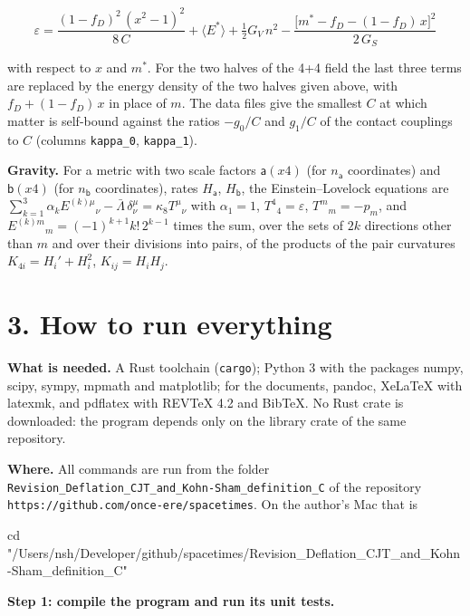 \documentclass[
  10pt,
]{article}
\newenvironment{Shaded}{}{}
\newcommand{\BuiltInTok}[1]{\textcolor[rgb]{0.00,0.50,0.00}{#1}}
\newcommand{\StringTok}[1]{\textcolor[rgb]{0.25,0.44,0.63}{#1}}
\begin{document}
\[\varepsilon=\frac{(1-f_D)^2\,(x^2-1)^2}{8\,C}+\langle E^*\rangle+\tfrac12G_V\,n^2-\frac{\big[m^*-f_D-(1-f_D)\,x\big]^2}{2\,G_S}\]

with respect to \(x\) and \(m^*\). For the two halves of the 4+4 field
the last three terms are replaced by the energy density of the two
halves given above, with \(f_D+(1-f_D)\,x\) in place of \(m\). The data
files give the smallest \(C\) at which matter is self-bound against the
ratios \(-g_0/C\) and \(g_1/C\) of the contact couplings to \(C\)
(columns \texttt{kappa\_0}, \texttt{kappa\_1}).

\textbf{Gravity.} For a metric with two scale factors \(\mathsf a(x4)\)
(for \(n_{\mathsf a}\) coordinates) and \(\mathsf b(x4)\) (for
\(n_{\mathsf b}\) coordinates), rates \(H_{\mathsf a}\),
\(H_{\mathsf b}\), the Einstein--Lovelock equations are
\(\sum_{k=1}^3\alpha_kE^{(k)\mu}{}_\nu-\bar\Lambda\,\delta^\mu_\nu=\kappa_8T^\mu{}_\nu\)
with \(\alpha_1=1\), \(T^4{}_4=\varepsilon\), \(T^m{}_m=-p_m\), and
\(E^{(k)m}{}_m=(-1)^{k+1}k!\,2^{k-1}\) times the sum, over the sets of
\(2k\) directions other than \(m\) and over their divisions into pairs,
of the products of the pair curvatures \(K_{4i}=H_i'+H_i^2\),
\(K_{ij}=H_iH_j\).

\hypertarget{how-to-run-everything}{%
\section{3. How to run everything}\label{how-to-run-everything}}

\textbf{What is needed.} A Rust toolchain (\texttt{cargo}); Python 3
with the packages numpy, scipy, sympy, mpmath and matplotlib; for the
documents, pandoc, XeLaTeX with latexmk, and pdflatex with REVTeX 4.2
and BibTeX. No Rust crate is downloaded: the program depends only on the
library crate of the same repository.

\textbf{Where.} All commands are run from the folder
\texttt{Revision\_Deflation\_CJT\_and\_Kohn-Sham\_definition\_C} of the
repository \texttt{https://github.com/once-ere/spacetimes}. On the
author's Mac that is

\begin{Shaded}
\begin{Highlighting}[]
\BuiltInTok{cd} \StringTok{"/Users/nsh/Developer/github/spacetimes/Revision\_Deflation\_CJT\_and\_Kohn{-}Sham\_definition\_C"}
\end{Highlighting}
\end{Shaded}

\textbf{Step 1: compile the program and run its unit tests.}
\end{document}
